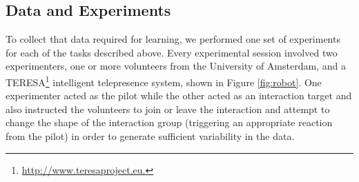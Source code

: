 \documentclass[letterpaper, 10 pt, conference]{ieeeconf}
\newcommand{\sw}[1]{\textcolor{red}{SW: #1}}
\newcommand{\ks}[1]{\textcolor{mypurp}{KS: #1}}
\begin{document}




\subsection{Data and Experiments \label{subsec:data_exp}} 

To collect that data required for learning, we performed one set of experiments for each of the tasks described above. Every experimental session involved two experimenters, one or more volunteers from the University of Amsterdam, and a TERESA\footnote{\url{http://www.teresaproject.eu.}} intelligent telepresence system, shown in Figure \ref{fig:robot}.  One experimenter acted as the pilot while the other acted as an interaction target and also instructed the volunteers to join or leave the interaction and attempt to change the shape of the interaction group (triggering an appropriate reaction from the pilot) in order to generate sufficient variability in the data.  
\end{document}
